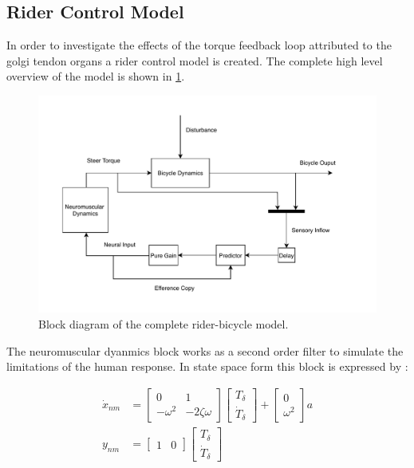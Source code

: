 \subsection{Rider Control Model}\label{subsec:rider_model}

In order to investigate the effects of the torque feedback loop attributed to the golgi tendon organs a rider control model is created. The complete high level overview of the model is shown in \cref{fig:paper3}.
\begin{figure}[ht]
    \centering
    \captionsetup{justification=centering,margin=2cm}

    \includegraphics[scale=0.8]{images/high_level_block.pdf}
    \caption{Block diagram of the complete rider-bicycle model.} 
    \label{fig:paper3}
\end{figure}

The neuromuscular dyanmics block works as a second order filter to simulate the limitations of the human response. In state space form this block is expressed by :

\begin{align}
\dot{x}_{nm} &= \begin{bmatrix}0 & 1 \\ -\omega^2 & -2\zeta\omega\end{bmatrix} \begin{bmatrix} T_\delta \\ \dot{T}_\delta\end{bmatrix} + \begin{bmatrix} 0 \\ \omega^2\end{bmatrix} a \\
    y_{nm} &= \begin{bmatrix}1 & 0\end{bmatrix} \begin{bmatrix} T_\delta \\ \dot{T}_\delta\end{bmatrix}
        \label{eq:gnmBLOCK}
\end{align}

